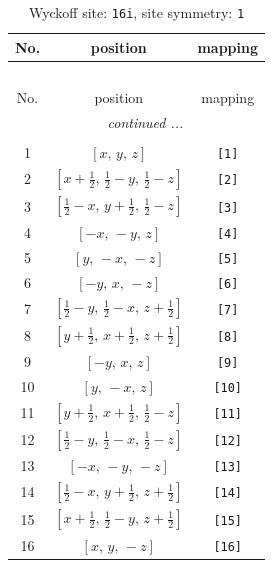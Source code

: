 \documentclass[fleqn,8pt]{jsarticle}
\begin{document}
\begin{longtable}{ccc}
\caption{Wyckoff site: {\tt 16i}, site symmetry: {\tt 1}}
 \\
 \hline \hline
No. & position & mapping \\ \hline \endfirsthead

\multicolumn{2}{l}{\tablename\ \thetable{}} \\
 \hline \hline
No. & position & mapping \\ \hline \endhead

 \hline \hline
\multicolumn{2}{r}{\footnotesize\it continued ...} \\ \endfoot

 \hline \hline
\multicolumn{2}{r}{} \\ \endlastfoot

1 & $\left[ x,\, y,\, z \right]$ & {\tt [1]} \\ \hline
2 & $\left[ x + \frac{1}{2},\, \frac{1}{2} - y,\, \frac{1}{2} - z \right]$ & {\tt [2]} \\ \hline
3 & $\left[ \frac{1}{2} - x,\, y + \frac{1}{2},\, \frac{1}{2} - z \right]$ & {\tt [3]} \\ \hline
4 & $\left[ - x,\, - y,\, z \right]$ & {\tt [4]} \\ \hline
5 & $\left[ y,\, - x,\, - z \right]$ & {\tt [5]} \\ \hline
6 & $\left[ - y,\, x,\, - z \right]$ & {\tt [6]} \\ \hline
7 & $\left[ \frac{1}{2} - y,\, \frac{1}{2} - x,\, z + \frac{1}{2} \right]$ & {\tt [7]} \\ \hline
8 & $\left[ y + \frac{1}{2},\, x + \frac{1}{2},\, z + \frac{1}{2} \right]$ & {\tt [8]} \\ \hline
9 & $\left[ - y,\, x,\, z \right]$ & {\tt [9]} \\ \hline
10 & $\left[ y,\, - x,\, z \right]$ & {\tt [10]} \\ \hline
11 & $\left[ y + \frac{1}{2},\, x + \frac{1}{2},\, \frac{1}{2} - z \right]$ & {\tt [11]} \\ \hline
12 & $\left[ \frac{1}{2} - y,\, \frac{1}{2} - x,\, \frac{1}{2} - z \right]$ & {\tt [12]} \\ \hline
13 & $\left[ - x,\, - y,\, - z \right]$ & {\tt [13]} \\ \hline
14 & $\left[ \frac{1}{2} - x,\, y + \frac{1}{2},\, z + \frac{1}{2} \right]$ & {\tt [14]} \\ \hline
15 & $\left[ x + \frac{1}{2},\, \frac{1}{2} - y,\, z + \frac{1}{2} \right]$ & {\tt [15]} \\ \hline
16 & $\left[ x,\, y,\, - z \right]$ & {\tt [16]} \\
\end{longtable}
\end{document}
